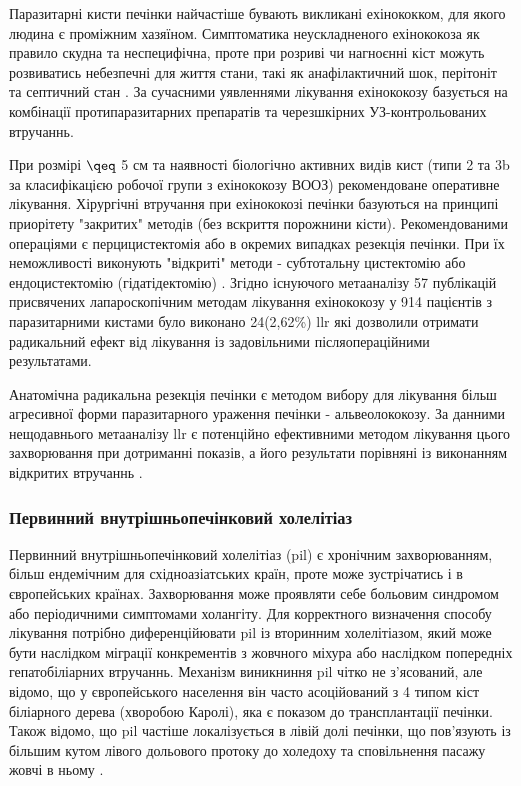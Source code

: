 \begin{refsection}
Паразитарні кисти печінки найчастіше бувають викликані ехінококком, для якого людина є проміжним хазяїном. Симптоматика неускладненого ехінококоза як правило скудна та неспецифічна, проте при розриві чи нагноєнні кіст можуть розвиватись небезпечні для життя стани, такі як анафілактичний шок, перітоніт та септичний стан \cite{Finazzi2015}. За сучасними уявленнями лікування ехінококозу базується на комбінації протипаразитарних препаратів та черезшкірних УЗ-контрольованих втручаннь. 

При розмірі $\qeq$ 5 см та наявності біологічно активних видів кист (типи 2 та 3b за класифікацією робочої групи з ехінококозу ВООЗ) рекомендоване оперативне лікування. Хірургічні втручання при ехінококозі печінки базуються на принципі приорітету "закритих" методів (без вскриття порожнини кісти). Рекомендованими операціями є перцицистектомія або в окремих випадках резекція печінки. При їх неможливості виконують "відкриті" методи - субтотальну цистектомію або ендоцистектомію (гідатідектомію) \cite{Wen2019}. Згідно існуючого метааналізу 57 публікацій присвячених лапароскопічним методам лікування ехінококозу у 914 пацієнтів з паразитарними кистами було виконано 24(2,62\%) \acrshort{llr} які дозволили отримати радикальний ефект від лікування із задовільними післяопераційними результатами.  

Анатомічна радикальна резекція печінки є методом вибору для лікування більш агресивної форми паразитарного ураження печінки - альвеолококозу. За данними нещодавнього метааналізу \acrshort{llr} є потенційно ефективними методом лікування цього захворювання при дотриманні показів, а його результати порівняні із виконанням відкритих втручаннь \cite{Salm2019}. 

\subsubsection{Первинний внутрішньопечінковий холелітіаз}

Первинний внутрішньопечінковий холелітіаз (\acrshort{pil}) є хронічним захворюванням, більш ендемічним для східноазіатських країн, проте може зустрічатись і в європейських країнах. Захворювання може проявляти себе больовим синдромом або періодичними симптомами холангіту. Для корректного визначення способу лікування потрібно диференційювати \acrshort{pil} із вторинним холелітіазом, який може бути наслідком міграції конкрементів з жовчного міхура або наслідком попередніх гепатобіліарних втручаннь. Механізм виникниння \acrshort{pil} чітко не з'ясований, але відомо, що у європейського населення він часто асоційований з 4 типом кіст біліарного дерева (хворобою Каролі), яка є показом до трансплантації печінки. Також відомо, що \acrshort{pil} частіше локалізується в лівій долі печінки, що пов'язують із більшим кутом лівого дольового протоку до холедоху та сповільнення пасажу жовчі в ньому \cite{Giuliante2015}.


\end{refsection}
